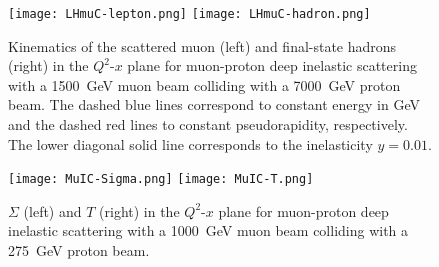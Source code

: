 \documentclass[12pt]{article}
\begin{document}
\begin{figure}[!htb]
    \centering
    \texttt{[image: LHmuC-lepton.png]}
    \texttt{[image: LHmuC-hadron.png]}
    \caption{Kinematics of the scattered muon (left) and final-state hadrons (right) in the $Q^2$-$x$ plane for muon-proton deep inelastic scattering with a 1500~GeV muon beam colliding with a 7000~GeV proton beam. The dashed blue lines correspond to constant  energy in GeV and the dashed red lines to constant pseudorapidity, respectively. The lower diagonal solid line corresponds to the inelasticity $y=0.01$.}
    \label{fig:LHmuCkinematics}
\end{figure}

\begin{figure}[!htb]
    \centering
    \texttt{[image: MuIC-Sigma.png]}
    \texttt{[image: MuIC-T.png]}
    \caption{$\Sigma$ (left)  and $T$ (right) in the $Q^2$-$x$ plane
      for muon-proton deep inelastic scattering with a 1000~GeV muon
      beam colliding with a 275~GeV proton beam.}
      \label{fig:MuICQ2SigmaT}
\end{figure}
\end{document}
